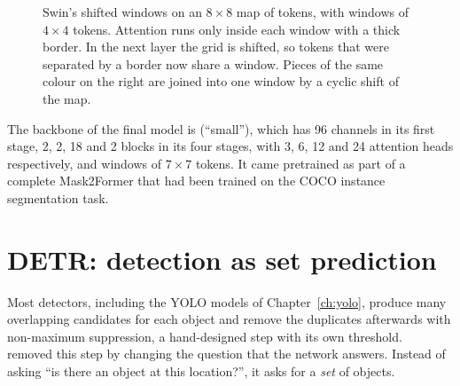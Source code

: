 \begin{figure}[t]
\centering
{}
\caption{Swin's shifted windows on an $8\times8$ map of tokens, with windows of $4\times4$ tokens.
Attention runs only inside each window with a thick border. In the next layer the grid is shifted, so
tokens that were separated by a border now share a window. Pieces of the same colour on the right are
joined into one window by a cyclic shift of the map. }
\label{fig:tr-swin}
\end{figure}

The backbone of the final model is  (``small''), which has 96 channels in its first
stage, 2, 2, 18 and 2 blocks in its four stages, with 3, 6, 12 and 24 attention heads respectively,
and windows of $7\times7$ tokens. It came pretrained as part of a complete Mask2Former that had been
trained on the COCO instance segmentation task.

\section{DETR: detection as set prediction}\label{sec:tr-detr}
Most detectors, including the YOLO models of Chapter~\ref{ch:yolo}, produce many overlapping
candidates for each object and remove the duplicates afterwards with non-maximum suppression, a
hand-designed step with its own threshold. ~\citep{detr} removed this step by changing
the question that the network answers. Instead of asking ``is there an object at this location?'', it
asks for a \emph{set} of objects.

